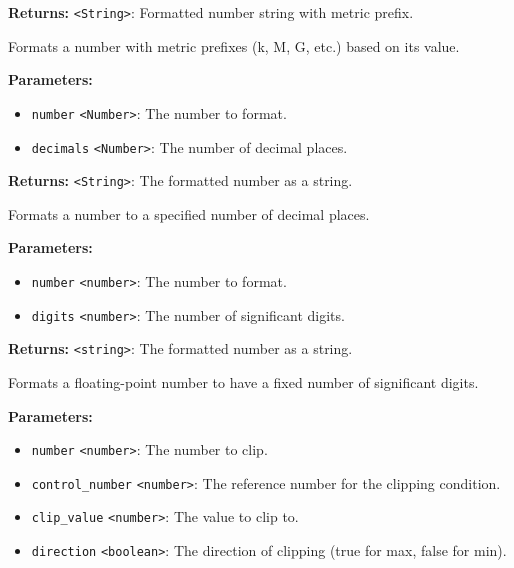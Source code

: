 \documentclass[12pt,a4paper]{article}
\begin{document}
\noindent \textbf{Returns:} \texttt{<String>}: Formatted number string with metric prefix.

\noindent Formats a number with metric prefixes (k, M, G, etc.) based on its value.

\vspace{5mm}
\noindent {}


\noindent \textbf{Parameters:}
\begin{itemize}
  \item \texttt{number} \texttt{<Number>}: The number to format.
  \item \texttt{decimals} \texttt{<Number>}: The number of decimal places.
\end{itemize}

\noindent \textbf{Returns:} \texttt{<String>}: The formatted number as a string.

\noindent Formats a number to a specified number of decimal places.

\vspace{5mm}
\noindent {}


\noindent \textbf{Parameters:}
\begin{itemize}
  \item \texttt{number} \texttt{<number>}: The number to format.
  \item \texttt{digits} \texttt{<number>}: The number of significant digits.
\end{itemize}

\noindent \textbf{Returns:} \texttt{<string>}: The formatted number as a string.

\noindent Formats a floating-point number to have a fixed number of significant digits.

\vspace{5mm}
\noindent {}


\noindent \textbf{Parameters:}
\begin{itemize}
  \item \texttt{number} \texttt{<number>}: The number to clip.
  \item \texttt{control\_number} \texttt{<number>}: The reference number for the clipping condition.
  \item \texttt{clip\_value} \texttt{<number>}: The value to clip to.
  \item \texttt{direction} \texttt{<boolean>}: The direction of clipping (true for max, false for min).
\end{itemize}
\end{document}
